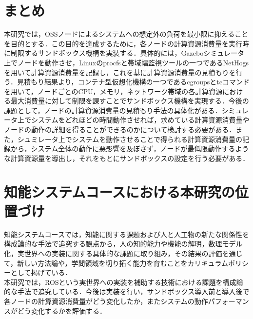 \documentclass[11pt]{ujarticle} %
\begin{document}
\section{まとめ}
本研究では，OSSノードによるシステムへの想定外の負荷を最小限に抑えることを目的とする．この目的を達成するために，各ノードの計算資源消費量を実行時に制限するサンドボックス機構を実装する．具体的には，Gazeboシミュレータ上でノードを動作させ，Linuxのprocfsと帯域幅監視ツールの一つであるNetHogsを用いて計算資源消費量を記録し，これを基に計算資源消費量の見積もりを行う．見積もり結果より，コンテナ型仮想化機構の一つであるcgroupsとtcコマンドを用いて，ノードごとのCPU，メモリ，ネットワーク帯域の各計算資源における最大消費量に対して制限を課すことでサンドボックス機構を実現する．今後の課題として，ノードの計算資源消費量の見積もり手法の具体化がある．シミュレータ上でシステムをどれほどの時間動作させれば，求めている計算資源消費量やノードの動作の詳細を得ることができるのかについて検討する必要がある．また，シュミレータ上でシステムを動作させることで得られる計算資源消費量の記録から，システム全体の動作に悪影響を及ぼさず，ノードが最低限動作するような計算資源量を導出し，それをもとにサンドボックスの設定を行う必要がある．

\section{知能システムコースにおける本研究の位置づけ}
知能システムコースでは，知能に関する課題および人と人工物の新たな関係性を構成論的な手法で追究する観点から，人の知的能力や機能の解明，数理モデル化，実世界への実装に関する具体的な課題に取り組み，その結果の評価を通じて，新しい方法論や，学問領域を切り拓く能力を育むことをカリキュラムポリシーとして掲げている．\\本研究では，ROSという実世界への実装を補助する技術における課題を構成論的な手法で追究している．今後は実装を行い，サンドボックス導入前と導入後で各ノードの計算資源消費量がどう変化したか，またシステムの動作パフォーマンスがどう変化するかを評価する．

\end{document}
